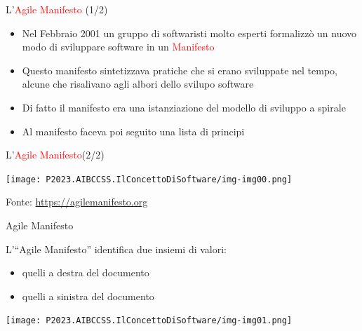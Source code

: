 \documentclass{beamer}
\begin{document}
\begin{frame}{\centerline{L'\textcolor{red}{Agile Manifesto} (1/2)}}
\begin{itemize}
    \item Nel Febbraio 2001 un gruppo di softwaristi molto esperti formalizz\`{o} un nuovo modo di sviluppare software in un \textcolor{red}{Manifesto}
    \item Questo manifesto sintetizzava pratiche che si erano sviluppate nel tempo, alcune che risalivano agli albori dello svilupo software
    \item Di fatto il manifesto era una istanziazione del modello di sviluppo a spirale
    \item Al manifesto faceva poi seguito una lista di principi
\end{itemize}
\end{frame}


\begin{frame}{\centerline{L'\textcolor{red}{Agile Manifesto}(2/2)}}

\begin{center}
\texttt{[image: P2023.AIBCCSS.IlConcettoDiSoftware/img-img00.png]}
\end{center}
\begin{center}
\tiny
Fonte: \url{https://agilemanifesto.org}
\end{center}

\end{frame}


\begin{frame}{\centerline{Agile Manifesto}}


L'``Agile Manifesto'' identifica due insiemi di valori:
\begin{itemize}
    \item quelli a destra del documento
    \item quelli a sinistra del documento
\end{itemize}

\begin{center}
\texttt{[image: P2023.AIBCCSS.IlConcettoDiSoftware/img-img01.png]}
\end{center}
\end{frame}
\end{document}
